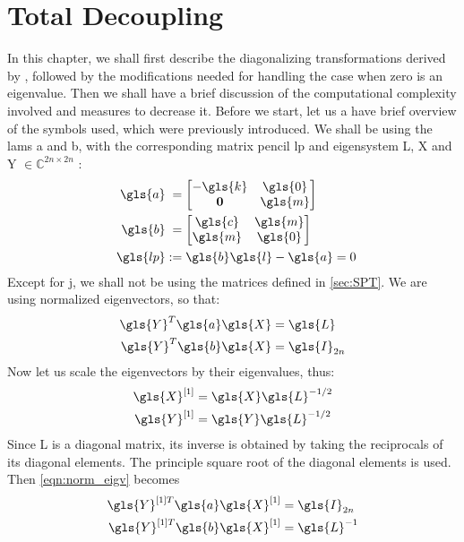 \chapter{Total Decoupling}
In this chapter, we shall first describe the diagonalizing transformations
derived by \citet{Chu200896}, followed by the modifications needed for 
handling the case when zero is an eigenvalue. Then we shall have a brief 
discussion of the computational complexity involved and measures to decrease 
it. Before we start, let us a have brief overview of the symbols used,
which were previously introduced. We shall be using the \glspl{lam} \gls{a}
and \gls{b}, with the corresponding matrix pencil \gls{lp} and eigensystem
\gls{L}, \gls{X} and \gls{Y} $\in \mathbb{C}^{2n\times 2n}$ :
\begin{align}
	\gls{a} &\phantom{:}= \begin{bmatrix}
	-\gls{k} & \gls{0}\\
	\mathbf{0} & \gls{m}
	\end{bmatrix}\\
	\quad\gls{b} &\phantom{:}= \begin{bmatrix}
	\gls{c} & \gls{m}\\
	\gls{m} & \gls{0}
	\end{bmatrix}\\	
	\gls{lp} &:= \gls{b}\gls{l} - \gls{a} = 0
\end{align}
Except for \gls{j}, we shall not be using the matrices defined in \autoref{sec:SPT}.
We are using normalized eigenvectors, so that:
\begin{subequations}
\label{eqn:norm_eigv}
\begin{align}
	\gls{Y}^T\gls{a}\gls{X} &= \gls{L}\\
	\gls{Y}^T\gls{b}\gls{X} &= \gls{I}_{2n}
\end{align}
\end{subequations}
Now let us scale the eigenvectors by their eigenvalues, thus:
\begin{align}
	\label{eqn:vec_scale}
	\gls{X}^{[1]} &= \gls{X}\gls{L}^{-1/2}\\
	\gls{Y}^{[1]} &= \gls{Y}\gls{L}^{-1/2}
\end{align}
Since \gls{L} is a diagonal matrix, its inverse is obtained by taking the 
reciprocals of its diagonal elements. The principle square root of the
diagonal elements is used. Then \eqref{eqn:norm_eigv} becomes
\begin{subequations}
\begin{align}
	\gls{Y}^{[1]T}\gls{a}\gls{X}^{[1]} &= \gls{I}_{2n}\\
	\gls{Y}^{[1]T}\gls{b}\gls{X}^{[1]} &= \gls{L}^{-1}
\end{align}
\end{subequations}

